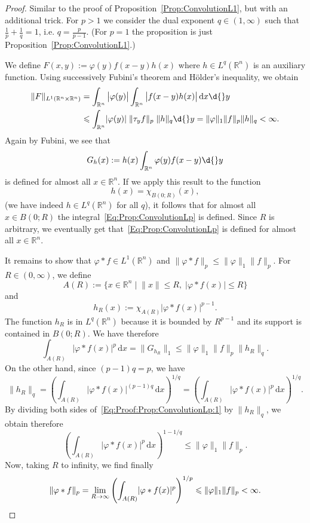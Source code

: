 \documentclass[12pt, oneside, a4paper]{article}
\theoremstyle{dfn}
\def\Rbb{\ensuremath{\mathbb{R}}}
\def\dx{\,\mathrm dx}
\providecommand{\norm}[1]{\lVert#1\rVert}
\providecommand{\abs}[1]{\lvert#1\rvert}
\providecommand{\absbig}[1]{\big\lvert#1\big\rvert}
\begin{document}
\begin{proof}
Similar to the proof of Proposition~\ref{Prop:ConvolutionL1}, but with an additional trick. For $p > 1$ we consider the dual exponent $q \in (1,\infty)$ such that $\frac{1}{p} + \frac{1}{q} = 1$, i.e. $q = \frac{p}{p-1}$. (For $p=1$ the proposition is just Proposition~\ref{Prop:ConvolutionL1}.)

We define $F(x,y):=\varphi(y)f(x-y)h(x)$ where $h \in L^q(\Rbb^n)$ is an auxiliary function. Using successively Fubini's theorem and Hölder's inequality, we obtain
\begin{align*}
	\norm{F}_{L^1(\Rbb^n \times \Rbb^n)}
	&= \int_{\Rbb^n} \absbig{\varphi(y)} \int_{\Rbb^n} \absbig{f(x-y) h(x)} \dx \d{}y \\
	&\leqslant \int_{\Rbb^n} \abs{\varphi(y)} \; \norm{\tau_y f}_p \; \norm{h}_q \d{}y
	= \norm{\varphi}_1 \norm{f}_p \norm{h}_q < \infty.
\end{align*}
Again by Fubini, we see that
\[
G_h(x) := h(x) \int_{\Rbb^n} \varphi(y) f(x-y) \d{}y
\]
is defined for almost all $x\in\Rbb^n$. If we apply this result to the function
\[
h(x) = \chi_{B(0;R)} (x),
\]
(we have indeed $h \in L^q(\Rbb^n)$ for all $q$), it follows that for almost all $x \in B(0;R)$ the integral~\eqref{Eq:Prop:ConvolutionLp} is defined. Since $R$ is arbitrary, we eventually get that~\eqref{Eq:Prop:ConvolutionLp} is defined for almost all $x \in \Rbb^n$.

It remains to show that $\varphi * f \in L^1(\Rbb^n)$ and $\norm{\varphi * f}_p \leqslant \norm{\varphi}_1 \norm{f}_p$. For $R \in (0,\infty)$, we define
\[
A(R) := \big\{x \in \Rbb^n \;\big|\; \norm{x} \leqslant R, \; \abs{\varphi * f(x)} \leqslant R \big\}
\]
and
\[
h_R(x) := \chi_{A(R)} \abs{\varphi * f(x)}^{p-1}.
\]
The function $h_R$ is in $L^q(\Rbb^n)$ because it is bounded by $R^{p-1}$ and its support is contained in $B(0;R)$.
We have therefore
\begin{equation}\label{Eq:Proof:Prop:ConvolutionLp:1}
\int_{A(R)} \abs{\varphi * f(x)}^p \dx
= \norm{G_{h_R}}_1
\leqslant \norm{\varphi}_1 \norm{f}_p \norm{h_R}_q.
\end{equation}
On the other hand, since $(p-1)q = p$, we have
\[
\norm{h_R}_q
= \left( \int_{A(R)} \abs{\varphi * f(x)}^{(p-1)q} \dx \right)^{1/q}
= \left( \int_{A(R)} \abs{\varphi * f(x)}^{p} \dx \right)^{1/q}.
\]
By dividing both sides of~\eqref{Eq:Proof:Prop:ConvolutionLp:1} by $\norm{h_R}_q$, we obtain therefore
\[
\left( \int_{A(R)} \abs{\varphi * f(x)}^{p} \dx \right)^{1 - 1/q}
\leqslant \norm{\varphi}_1 \norm{f}_p.
\]
Now, taking $R$ to infinity, we find finally
\[
\norm{\varphi * f}_p
= \lim_{R\to\infty} \left( \int_{A(R)} \abs{\varphi * f(x)}^p \right)^{1/p} \leqslant \norm{\varphi}_1 \norm{f}_p < \infty.
\qedhere
\]
\end{proof}
\end{document}
